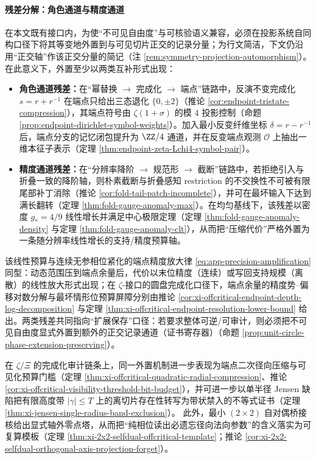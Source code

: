 \paragraph{残差分解：角色通道与精度通道}
在本文既有接口内，为使“不可见自由度”与可核验语义兼容，必须在投影系统自同构口径下将其等变地外置到与可见切片正交的记录分量；为行文简洁，下文仍沿用“正交轴”作该正交分量的简记（注 \ref{rem:symmetry-projection-automorphism}）。在此意义下，外置至少以两类互补形式出现：
\begin{itemize}
  \item \textbf{角色通道残差：}在“幂替换 \(\to\) 完成化 \(\to\) 端点”链路中，反演不变完成化 \(s=r+r^{-1}\) 在端点只给出三态退化 \(\{0,\pm 2\}\)（推论 \ref{cor:endpoint-tristate-compression}），其端点符号由 \(\zeta(1+\sigma)\) 的模 \(4\) 投影控制（命题 \ref{prop:endpoint-dirichlet-symbol-weights}）。加入最小反变纤维坐标 \(\delta=r-r^{-1}\) 后，端点分支的记忆闭包提升为 \(\ZZ/4\) 通道，并在反变端点观测 \(\mathcal O\) 上抽出一维本征子表示（定理 \ref{thm:endpoint-zeta-Lchi4-symbol-pair}）。
  \item \textbf{精度通道残差：}在“分辨率降阶 \(\to\) 规范形 \(\to\) 截断”链路中，若拒绝引入与折叠一致的降阶轴，则朴素截断与折叠感知 restriction 的不交换性不可被有限尾部补丁消除（推论 \ref{cor:fold-tail-patch-incomplete}），并可在最坏输入下达到满长翻转（定理 \ref{thm:fold-gauge-anomaly-max}）。在均匀基线下，该残差以密度 \(g_\ast=4/9\) 线性增长并满足中心极限定理（定理 \ref{thm:fold-gauge-anomaly-density} 与定理 \ref{thm:fold-gauge-anomaly-clt}），从而把“压缩代价”严格外置为一条随分辨率线性增长的支持/精度预算轴。
\end{itemize}
该线性预算与连续无参相位紧化的端点精度放大律 \eqref{eq:app-precision-amplification} 同型：动态范围压到端点余量后，代价以末位精度（连续）或写回支持规模（离散）的线性放大形式出现；在 \(\zeta\)-接口的圆盘完成化口径下，端点余量的精度势--偏移对数分解与最坏情形位预算屏障分别由推论 \ref{cor:xi-offcritical-endpoint-depth-log-decomposition} 与定理 \ref{thm:xi-offcritical-endpoint-resolution-lower-bound} 给出。两类残差共同指向“扩展保存”口径：若要求整体可逆/可审计，则必须把不可见自由度显式外置到额外的正交记录通道（证书寄存器）（命题 \ref{prop:unit-circle-phase-extension-preserving}）。
\par
在 \(\zeta/\Xi\) 的完成化审计链条上，同一外置机制进一步表现为端点二次径向压缩与可见化预算门槛（定理 \ref{thm:xi-offcritical-quadratic-radial-compression}、推论 \ref{cor:xi-offcritical-visibility-threshold-bit-budget}），并可进一步以单半径 Jensen 缺陷把有限高度带 \(|\gamma|\le T\) 上的离切片存在性转写为带状禁入的不等式证书（定理 \ref{thm:xi-jensen-single-radius-band-exclusion}）。
此外，最小 \((2\times2)\) 自对偶桥接核给出显式轴外零点塔，从而把“纯相位读出必遗忘径向法向参数”的含义落实为可复算模板（定理 \ref{thm:xi-2x2-selfdual-offcritical-template}；推论 \ref{cor:xi-2x2-selfdual-orthogonal-axis-projection-forget}）。


